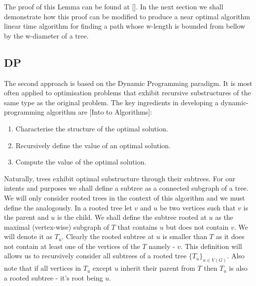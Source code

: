The proof of this Lemma can be found at []. In the next section we shall demonstrate how this proof can be modified to produce a near optimal algorithm linear time algorithm for finding a path whose w-length is bounded from bellow by the w-diameter of a tree.


\subsection{DP}

The second approach is based on the Dynamic Programming paradigm. It is most often applied to optimisation problems that exhibit recursive substructures of the same type as the original problem. The key ingredients in developing a dynamic-programming algorithm are [Into to Algorithms]:


\begin{enumerate}
    \item Characterise the structure of the optimal solution.
    \item Recursively define the value of an optimal solution.
    \item Compute the value of the optimal solution.
\end{enumerate}


Naturally, trees exhibit optimal substructure through their subtrees. For our intents and purposes we shall define a subtree as a connected subgraph of a tree. We will only consider rooted trees in the context of this algorithm and we must define the analogously. In a rooted tree let $v$ and $u$ be two vertices such that $v$ is the parent and $u$ is the child. We shall define the subtree rooted at $u$ as the maximal (vertex-wise) subgraph of $T$ that contains $u$ but does not contain $v$. We will denote it as $T_u$. Clearly the rooted subtree at $u$ is smaller than $T$ as it does not contain at least one of the vertices of the $T$ namely - $v$. This definition will allows us to recursively consider all subtrees of a rooted tree $\{T_u\}_{u \in V(G)}$. Also note that if all vertices in $T_u$ except $u$ inherit their parent from $T$ then $T_u$ is also a rooted subtree - it's root being $u$.

